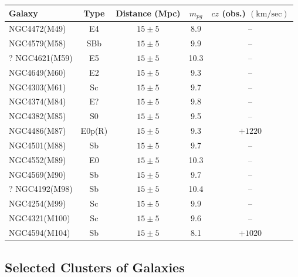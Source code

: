 \begin{center}
\begin{tabular}{@{}lcccc@{}}
\toprule
Galaxy & Type & Distance (Mpc) & \(m_{pg}\) &
  \(cz\) (obs.) \((\mathrm{km/sec})\)\\
\midrule
NGC4472(M49)   & E4      & \(15\pm5\) & 8.9  & --\\
NGC4579(M58)   & SBb     & \(15\pm5\) & 9.9  & --\\
? NGC4621(M59) & E5      & \(15\pm5\) & 10.3 & --\\
NGC4649(M60)   & E2      & \(15\pm5\) & 9.3  & --\\
NGC4303(M61)   & Sc      & \(15\pm5\) & 9.7  & --\\
NGC4374(M84)   & E?      & \(15\pm5\) & 9.8  & --\\
NGC4382(M85)   & S0      & \(15\pm5\) & 9.5  & --\\
NGC4486(M87)   & E0p(R)  & \(15\pm5\) & 9.3  & \(+1220\)\\
NGC4501(M88)   & Sb      & \(15\pm5\) & 9.7  & --\\
NGC4552(M89)   & E0      & \(15\pm5\) & 10.3 & --\\
NGC4569(M90)   & Sb      & \(15\pm5\) & 9.7  & --\\
? NGC4192(M98) & Sb      & \(15\pm5\) & 10.4 & --\\
NGC4254(M99)   & Sc      & \(15\pm5\) & 9.9  & --\\
NGC4321(M100)  & Sc      & \(15\pm5\) & 9.6  & --\\
NGC4594(M104)  & Sb      & \(15\pm5\) & 8.1  & \(+1020\)\\
\bottomrule
\end{tabular}
\end{center}

\subsection*{Selected Clusters of Galaxies}

